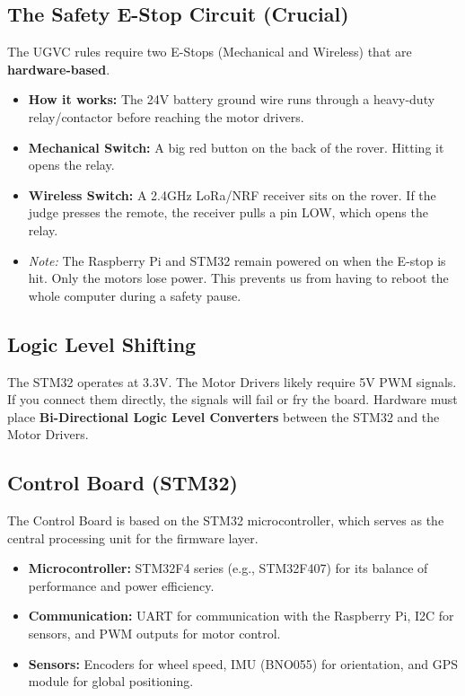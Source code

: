 \documentclass[12pt, a4paper]{article}
\begin{document}
\subsection{The Safety E-Stop Circuit (Crucial)}
The UGVC rules require two E-Stops (Mechanical and Wireless) that are \textbf{hardware-based}.
\begin{itemize}
    \item \textbf{How it works:} The 24V battery ground wire runs through a heavy-duty relay/contactor before reaching the motor drivers.
    \item \textbf{Mechanical Switch:} A big red button on the back of the rover. Hitting it opens the relay.
    \item \textbf{Wireless Switch:} A 2.4GHz LoRa/NRF receiver sits on the rover. If the judge presses the remote, the receiver pulls a pin LOW, which opens the relay.
    \item \textit{Note:} The Raspberry Pi and STM32 remain powered on when the E-stop is hit. Only the motors lose power. This prevents us from having to reboot the whole computer during a safety pause.
\end{itemize}

\subsection{Logic Level Shifting}
The STM32 operates at 3.3V. The Motor Drivers likely require 5V PWM signals. If you connect them directly, the signals will fail or fry the board. Hardware must place \textbf{Bi-Directional Logic Level Converters} between the STM32 and the Motor Drivers.

\subsection{Control Board (STM32)}
The Control Board is based on the STM32 microcontroller, which serves as the central processing unit for the firmware layer.

\begin{itemize}
    \item \textbf{Microcontroller:} STM32F4 series (e.g., STM32F407) for its balance of performance and power efficiency.
    \item \textbf{Communication:} UART for communication with the Raspberry Pi, I2C for sensors, and PWM outputs for motor control.
    \item \textbf{Sensors:} Encoders for wheel speed, IMU (BNO055) for orientation, and GPS module for global positioning.
\end{itemize}
\end{document}
